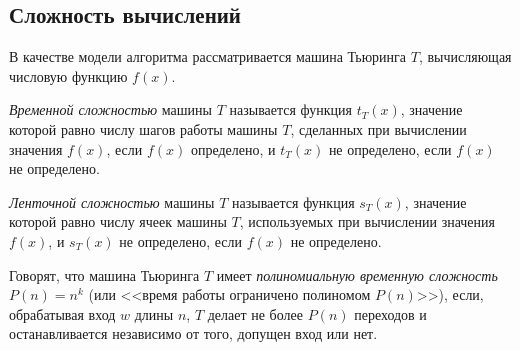 \subsection*{Сложность вычислений}
В качестве модели алгоритма рассматривается машина Тьюринга $T$, вычисляющая числовую функцию $f(x)$.

\begin{definition}
    \textit{Временной сложностью} машины $T$ называется функция $t_T(x)$, значение которой равно числу шагов работы машины $T$, сделанных при вычислении значения $f(x)$, если $f(x)$ определено, и $t_T(x)$ не определено, если $f(x)$ не определено.
\end{definition}

\begin{definition}
    \textit{Ленточной сложностью} машины $T$ называется функция $s_T(x)$, значение которой равно числу ячеек машины $T$, используемых при вычислении значения $f(x)$, и $s_T(x)$ не определено, если $f(x)$ не определено. 
\end{definition}

\begin{definition}
    Говорят, что машина Тьюринга $T$ имеет \textit{полиномиальную временную сложность} $P(n)=n^k$ (или <<время работы ограничено полиномом $P(n)$>>), если, обрабатывая вход $w$ длины $n$, $T$ делает не более $P(n)$ переходов и останавливается независимо от того, допущен вход или нет.
\end{definition}